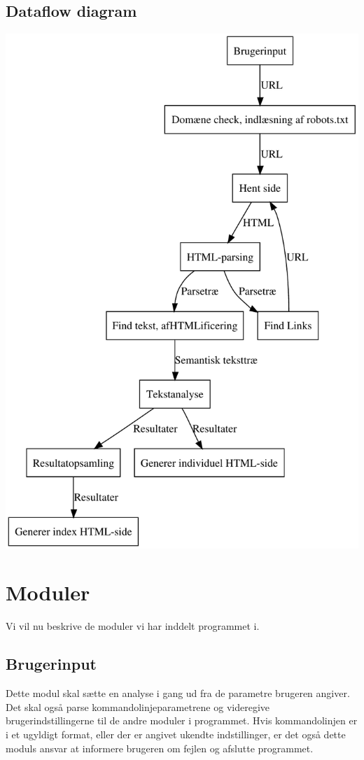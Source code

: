 \documentclass[a4paper,oneside,article, titlepage]{memoir}
\begin{document}
\section{Dataflow diagram}
\includegraphics{designill.pdf}


\chapter{Moduler}
Vi vil nu beskrive de moduler vi har inddelt programmet i.

\section{Brugerinput}
Dette modul skal sætte en analyse i gang ud fra de parametre brugeren
angiver. Det skal også parse kommandolinjeparametrene og videregive
brugerindstillingerne til de andre moduler i programmet. Hvis
kommandolinjen er i et ugyldigt format, eller der er angivet ukendte
indstillinger, er det også dette moduls ansvar at informere brugeren
om fejlen og afslutte programmet.
\end{document}
